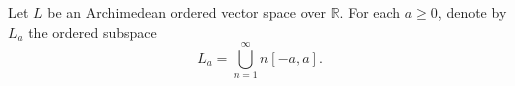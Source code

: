 Let $L$ be an Archimedean ordered vector space over $\mathbb{R}$. For each $a \geq 0$, denote by $L_a$ the ordered subspace
$$L_a = \bigcup_{n=1}^{\infty} n[-a, a].$$
